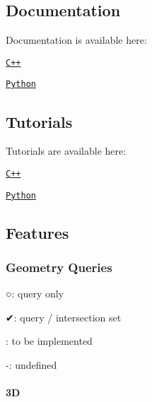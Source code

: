 \subsection*{Documentation}

Documentation is available here\+:


\begin{DoxyItemize}
\item \href{https://open-space-collective.github.io/open-space-toolkit-mathematics}{\tt C++}
\item \href{./bindings/python/docs}{\tt Python}
\end{DoxyItemize}

\subsection*{Tutorials}

Tutorials are available here\+:


\begin{DoxyItemize}
\item \href{./tutorials/cpp}{\tt C++}
\item \href{./tutorials/python}{\tt Python}
\end{DoxyItemize}

\subsection*{Features}

\subsubsection*{Geometry Queries}


\begin{DoxyItemize}
\item {\ttfamily ○}\+: query only
\item {\ttfamily ✔}\+: query / intersection set
\item \+: to be implemented
\item {\ttfamily -\/}\+: undefined
\end{DoxyItemize}

\paragraph*{3D}

